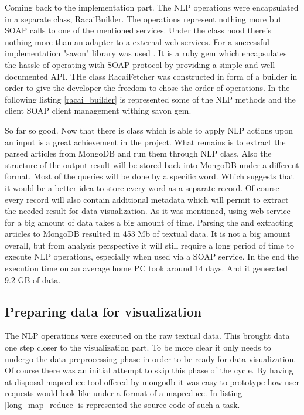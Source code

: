 Coming back to the implementation part. The NLP operations were encapsulated in a separate class, RacaiBuilder. The operations represent nothing more but SOAP calls to one of the mentioned services. Under the class hood there's nothing more than an adapter to a external web services. For a successful implementation "savon" library was used \cite{savon_gem}. It is a ruby gem which encapsulates the hassle of operating with SOAP protocol by providing a simple and well documented API. THe class RacaiFetcher was constructed in form of a builder in order to give the developer the freedom to chose the order of operations. In the following  listing \ref{racai_builder} is represented some of the NLP methods and the client SOAP client management withing savon gem.



So far so good. Now that there is class which is able to apply NLP actions upon an input is a great achievement in the project. What remains is to extract the parsed articles from MongoDB and run them through NLP class. Also the structure of the output result will be stored back into MongoDB under a different format. Most of the queries will be done by a specific word. Which suggests that it would be a better idea to store every word as a separate record. Of course every record will also contain additional metadata which will permit to extract the needed result for data visualization. As it was mentioned, using web service for a big amount of data takes a big amount of time. Parsing the and extracting articles to MongoDB resulted in 453 Mb of textual data. It is not a big amount overall, but from analysis perspective it will still require a long period of time to execute NLP operations, especially when used via a SOAP service. In the end the execution time on an average home PC took around 14 days. And it generated 9.2 GB of data.

\subsection{Preparing data for visualization}
The NLP operations were executed on the raw textual data. This brought data one step closer to the visualization part. To be more clear it only needs to undergo the data preprocessing phase in order to be ready for data visualization. Of course there was an initial attempt to skip this phase of the cycle. By having at disposal mapreduce tool offered by mongodb it was easy to prototype how user requests would look like under a format of a mapreduce. In listing \ref{long_map_reduce} is represented the source code of such a task.

